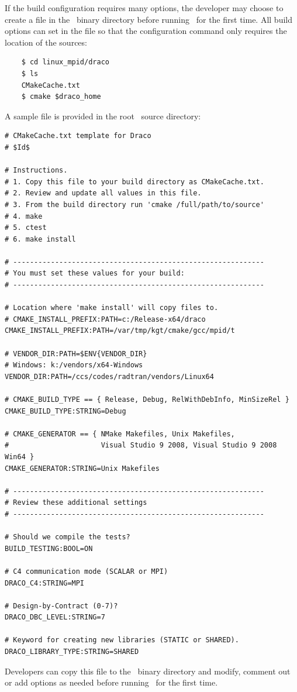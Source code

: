If the build configuration requires many options, the developer may choose to create a  file in the \draco\ binary directory before running \cmake\ for the first time.  All build options can set in the  file so that the configuration command only requires the location of the sources:
\begin{verbatim}
    $ cd linux_mpid/draco
    $ ls
    CMakeCache.txt
    $ cmake $draco_home
\end{verbatim}
A sample  file is provided in the root \draco\ source directory:
%
\begin{lstlisting}[basicstyle=\footnotesize, xleftmargin=0.0in, xrightmargin=0.0in]
# CMakeCache.txt template for Draco
# $Id$

# Instructions.
# 1. Copy this file to your build directory as CMakeCache.txt.
# 2. Review and update all values in this file.
# 3. From the build directory run 'cmake /full/path/to/source'
# 4. make
# 5. ctest
# 6. make install

# ------------------------------------------------------------
# You must set these values for your build:
# ------------------------------------------------------------

# Location where 'make install' will copy files to.
# CMAKE_INSTALL_PREFIX:PATH=c:/Release-x64/draco
CMAKE_INSTALL_PREFIX:PATH=/var/tmp/kgt/cmake/gcc/mpid/t

# VENDOR_DIR:PATH=$ENV{VENDOR_DIR}
# Windows: k:/vendors/x64-Windows
VENDOR_DIR:PATH=/ccs/codes/radtran/vendors/Linux64

# CMAKE_BUILD_TYPE == { Release, Debug, RelWithDebInfo, MinSizeRel }
CMAKE_BUILD_TYPE:STRING=Debug

# CMAKE_GENERATOR == { NMake Makefiles, Unix Makefiles, 
#                      Visual Studio 9 2008, Visual Studio 9 2008 Win64 }
CMAKE_GENERATOR:STRING=Unix Makefiles

# ------------------------------------------------------------
# Review these additional settings
# ------------------------------------------------------------

# Should we compile the tests?
BUILD_TESTING:BOOL=ON

# C4 communication mode (SCALAR or MPI)
DRACO_C4:STRING=MPI

# Design-by-Contract (0-7)?
DRACO_DBC_LEVEL:STRING=7
 
# Keyword for creating new libraries (STATIC or SHARED).
DRACO_LIBRARY_TYPE:STRING=SHARED
\end{lstlisting}
Developers can copy this file to the \draco\ binary directory and modify, comment out or add options as needed before running \cmake\ for the first time.

